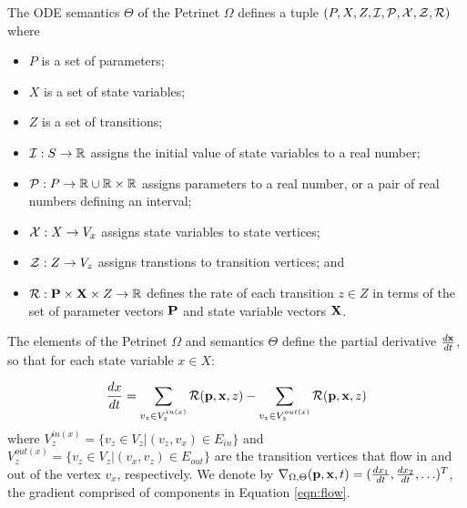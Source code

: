 \begin{definition}
    The ODE semantics $\Theta$ of the Petrinet $\Omega$ defines a tuple $(P, X,
    Z, {\cal I}, {\cal P}, {\cal X}, {\cal Z}, {\cal R})$ where 
    \begin{itemize}
        \item $P$ is a set of parameters;
        \item $X$ is a set of state variables;
        \item $Z$ is a set of transitions;
        \item ${\cal I}: S \rightarrow {\mathbb{R}}$ assigns the initial value of
        state variables to a real number;
        \item ${\cal P}: P \rightarrow {\mathbb{R}} \cup {\mathbb{R}} \times {\mathbb{R}}$ assigns
        parameters to a real number, or a pair of real numbers defining an
        interval;
        \item ${\cal X}: X \rightarrow V_x$ assigns state variables to state
        vertices;
        \item ${\cal Z}: Z \rightarrow V_z$ assigns transtions to transition
        vertices; and
        \item ${\cal R}: {\bf P} \times {\bf X} \times Z \rightarrow {\mathbb{R}}$
        defines the rate of each transition  $z \in Z$ in terms of the set of
        parameter vectors ${\bf P}$ and state variable vectors ${\bf X}$.  
    \end{itemize}
    The elements of the Petrinet $\Omega$ and semantics $\Theta$ define the
    partial derivative $\frac{d {\bf x}}{dt}$, so that for each state variable
    $x \in X$:
    
    \begin{equation}\label{eqn:flow}
        \frac{dx}{dt} = \sum_{v_z \in V_z^{in(x)}} {\cal R}({\bf p}, {\bf x}, z) - \sum_{v_z \in V_z^{out(x)} } {\cal R}({\bf p}, {\bf x}, z)
    \end{equation}
\noindent where $V_z^{in(x)} = \{v_z \in V_z | (v_z, v_x) \in E_{in}\}$ and
    $V_z^{out(x)}=\{v_z \in V_z| (v_x, v_z) \in E_{out}\}$ are the transition
    vertices that flow in and out of the vertex $v_x$, respectively. We denote
    by $\nabla_{\Omega, \Theta}({\bf p}, {\bf x}, t) = (\frac{dx_1}{dt},
    \frac{dx_2}{dt}, \ldots)^T$, the gradient comprised of components in
    Equation \eqref{eqn:flow}.
\end{definition}

